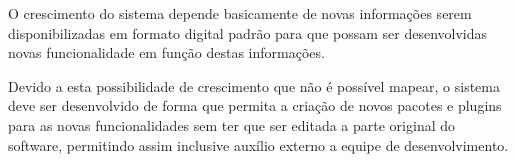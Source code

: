 
O crescimento do sistema depende basicamente de novas informações serem disponibilizadas em formato digital padrão para que possam ser desenvolvidas novas funcionalidade em função destas informações.

Devido a esta possibilidade de crescimento que não é possível mapear, o sistema deve ser desenvolvido de forma que permita a criação de novos pacotes e plugins para as novas funcionalidades sem ter que ser editada a parte original do software, permitindo assim inclusive auxílio externo a equipe de desenvolvimento.